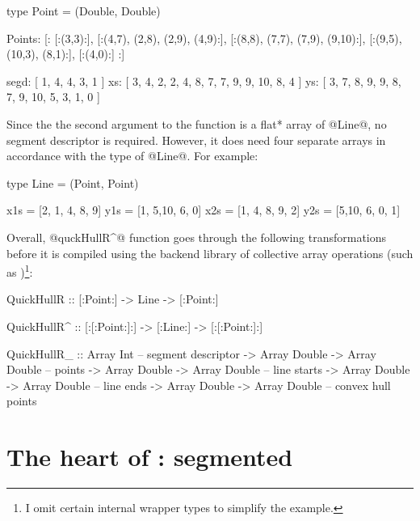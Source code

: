 \documentclass[preamble.tex]{subfiles}
\begin{document}
\begin{hscode}
type Point = (Double, Double)

Points:
  [:
     [:(3,3):],
     [:(4,7), (2,8),  (2,9), (4,9):],
     [:(8,8), (7,7),  (7,9), (9,10):],
     [:(9,5), (10,3), (8,1):],
     [:(4,0):]
  :]


segd: [ 1, 4, 4, 3, 1 ]
xs:   [ 3, 4, 2, 2, 4, 8, 7, 7,  9, 9, 10, 8, 4 ]
ys:   [ 3, 7, 8, 9, 9, 8, 7, 9, 10, 5,  3, 1, 0 ]
\end{hscode}


Since the the second argument to the function is a \*flat* array of @Line@, no segment descriptor is required. However, it does need four separate arrays in accordance with the type of @Line@. For example:


\begin{hscode}
type Line = (Point, Point)

x1s = [2, 1, 4, 8, 9]
y1s = [1, 5,10, 6, 0]
x2s = [1, 4, 8, 9, 2]
y2s = [5,10, 6, 0, 1]
\end{hscode}


Overall, @quckHullR^@ function goes through the following transformations before it is compiled using the backend library of collective array operations (such as \LiveFusion)\footnote{I omit certain internal wrapper types to simplify the example.}:

\begin{hscode}[literate={^}{{$^\uparrow$}}1,]
QuickHullR  :: [:Point:] -> Line -> [:Point:]


QuickHullR^ :: [:[:Point:]:] -> [:Line:] -> [:[:Point:]:]


QuickHullR_ :: Array Int                      -- segment descriptor
            -> Array Double -> Array Double   -- points
            -> Array Double -> Array Double   -- line starts
            -> Array Double -> Array Double   -- line ends            
            -> Array Double -> Array Double   -- convex hull points
\end{hscode}



\section{The heart of \QuickHull: segmented \FilterMax}
\label{sec:FilterMax}
\end{document}
